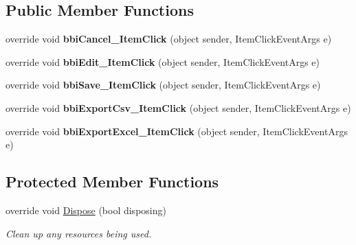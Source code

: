 \subsection*{Public Member Functions}
\begin{DoxyCompactItemize}
\item 
\mbox{\label{class_h_k_supply_1_1_forms_1_1_master_1_1_item_management_h_f_aedc20370f078d14e2647f9ad250399b8}} 
override void {\bfseries bbi\+Cancel\+\_\+\+Item\+Click} (object sender, Item\+Click\+Event\+Args e)
\item 
\mbox{\label{class_h_k_supply_1_1_forms_1_1_master_1_1_item_management_h_f_ad82bcd5c1f3b71d546cfc9d6cbd24c03}} 
override void {\bfseries bbi\+Edit\+\_\+\+Item\+Click} (object sender, Item\+Click\+Event\+Args e)
\item 
\mbox{\label{class_h_k_supply_1_1_forms_1_1_master_1_1_item_management_h_f_a8e66a8f3b77c4f0604fc07ed8ae224e0}} 
override void {\bfseries bbi\+Save\+\_\+\+Item\+Click} (object sender, Item\+Click\+Event\+Args e)
\item 
\mbox{\label{class_h_k_supply_1_1_forms_1_1_master_1_1_item_management_h_f_a99a96049632b1f93b4afdfedf4917db3}} 
override void {\bfseries bbi\+Export\+Csv\+\_\+\+Item\+Click} (object sender, Item\+Click\+Event\+Args e)
\item 
\mbox{\label{class_h_k_supply_1_1_forms_1_1_master_1_1_item_management_h_f_ac2cb02ac40d28fbfc3e90421ad44e957}} 
override void {\bfseries bbi\+Export\+Excel\+\_\+\+Item\+Click} (object sender, Item\+Click\+Event\+Args e)
\end{DoxyCompactItemize}
\subsection*{Protected Member Functions}
\begin{DoxyCompactItemize}
\item 
override void \mbox{\hyperlink{class_h_k_supply_1_1_forms_1_1_master_1_1_item_management_h_f_a5110e62d48874b23703c69ef3d70e727}{Dispose}} (bool disposing)
\begin{DoxyCompactList}\small\item\em Clean up any resources being used. \end{DoxyCompactList}\end{DoxyCompactItemize}
